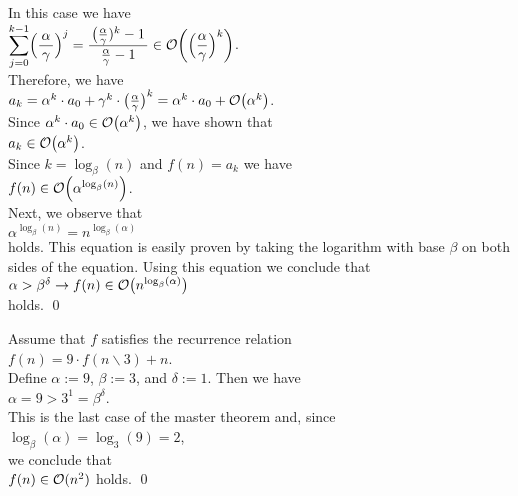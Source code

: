 \begin{enumerate}
      In this case we have
      \\[0.2cm]
      \hspace*{1.3cm}
      $\ds\sum\limits_{j=0}^{k-1} \Bigl(\frac{\,\alpha\,}{\gamma}\Bigr)^j = \bruch{\bigl(\frac{\alpha}{\gamma})^k - 1}{\frac{\alpha}{\gamma} - 1} \in \Oh\biggl(\Bigl(\frac{\alpha}{\gamma}\Bigr)^k\biggr)$.
      \\[0.2cm]
      Therefore, we have
      \\[0.2cm]
      \hspace*{1.3cm}
      $a_k = \alpha^k\cdot a_0 + \gamma^k \cdot \bigl(\frac{\alpha}{\gamma}\bigr)^k = \alpha^k\cdot a_0 + \mathcal{O}\bigl(\alpha^k\bigr)$.
      \\[0.2cm] 
      Since $\alpha^k \cdot a_0 \in \mathcal{O}\bigl(\alpha^k\bigr)$, we have shown that
      \\[0.2cm]
      \hspace*{1.3cm}
      $a_k \in  \mathcal{O}\bigl(\alpha^k\bigr)$.
      \\[0.2cm]
      Since  $k = \log_{\beta}(n)$ and $f(n) = a_k$ we have
      \\[0.2cm]
      \hspace*{1.3cm}
      $f(n) \in \mathcal{O}\Bigl(\alpha^{\log_{\beta}(n)}\Bigr)$.
      \\[0.2cm] 
      Next, we observe that 
      \\[0.2cm]
      \hspace*{1.3cm}
      $\alpha^{\log_{\beta}(n)} = n^{\log_{\beta}(\alpha)}$
      \\[0.2cm]
      holds.   This equation is easily proven by taking the logarithm with base $\beta$ on both sides
      of the equation.  Using this equation we conclude that
      \\[0.2cm]
      \hspace*{1.3cm}
      $\alpha > \beta^\delta \rightarrow f(n) \in \mathcal{O}\bigl(n^{\log_{\beta}(\alpha)}\bigr)$
      \\[0.2cm]
      holds.  \qed
\end{enumerate}


\example
Assume that $f$ satisfies the recurrence relation
\\[0.2cm]
\hspace*{1.3cm}
$f(n) = 9 \cdot f(n \backslash 3) + n$.
\\[0.2cm] 
Define $\alpha := 9$, $\beta := 3$, and $\delta := 1$.
Then we have
\\[0.2cm]
\hspace*{1.3cm}
$\alpha = 9 > 3^1 = \beta^\delta$.
\\[0.2cm] 
This is the last case of the master theorem and, since 
\\[0.2cm]
\hspace*{1.3cm}
$\log_{\beta}(\alpha) = \log_3(9) = 2$,
\\[0.2cm]
we conclude that
\\[0.2cm]
\hspace*{1.3cm}
$f(n) \in \mathcal{O}(n^2)$ \quad holds.
 \qed


